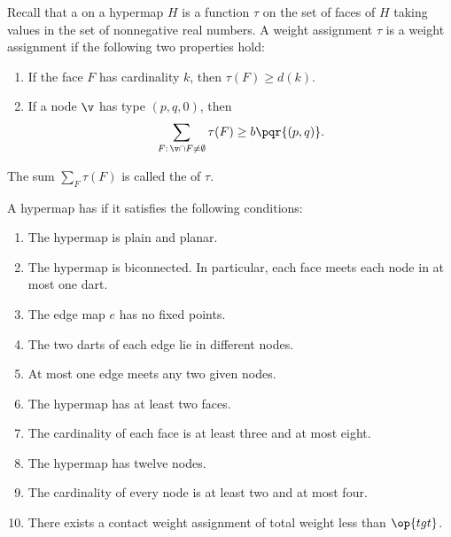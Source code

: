 %
%
\begin{definition}
%
  Recall that a  
on a hypermap $H$ is a
  function $\tau$ on the set of faces of $H$ taking values in the set
  of nonnegative real numbers. A weight assignment $\tau$
is a 
  weight assignment if the following two properties hold:
%
\begin{enumerate}
\item If the face $F$ has cardinality $k$, then
$\tau(F) \ge d(k)$.
\item If a node $\v$ has type $(p,q,0)$, then
  \[\sum_{F:\,\v\cap F\ne\emptyset} \tau(F) \ge
    b{\pqr{(p,q)}}.\]
\end{enumerate}
The sum $\sum_F \tau(F)$ is called the  of $\tau$.
\end{definition}
%

\begin{definition}
  A hypermap has  if it satisfies the following 
  conditions:
%
%
%
%
%
%
%
%
%
\begin{enumerate}
\item {} The hypermap is plain and planar.
\item {} The hypermap is biconnected.  In particular,
  each face meets each node in at most one dart.
\item {} The edge map $e$ has no fixed points.
\item {} The two darts of each edge lie in different
  nodes.
\item {} At most one edge meets any two given
  nodes.
\item {} The hypermap has at least two faces.
\item {} The cardinality of each face is at least three
  and at most eight.
\item {} The hypermap has twelve nodes.
\item {} The cardinality of every node is at least two  and at most four.
\item {} There exists a contact weight assignment of total
  weight less than $\op{tgt}$.
\end{enumerate}
%
\end{definition}


